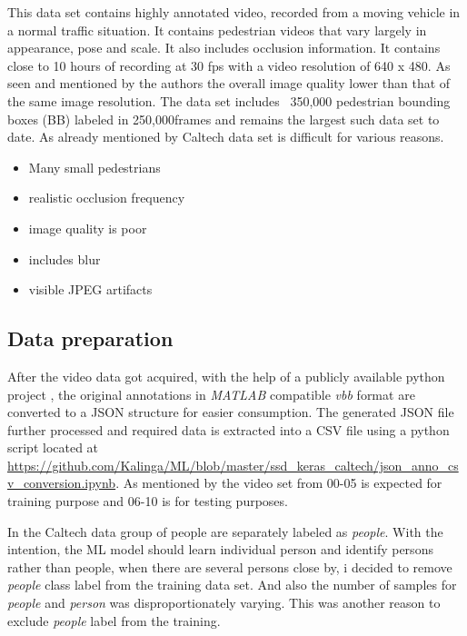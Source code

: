 \newpara
This data set contains highly annotated video, recorded from a moving vehicle in a normal traffic situation. It contains pedestrian videos that vary largely in appearance, pose and scale. It also includes occlusion information. It contains close to 10 hours of recording at 30 fps with a video resolution of 640 x 480. As seen and mentioned by the authors the overall image quality lower than that of the same image resolution. The data set includes ~350,000  pedestrian bounding boxes (BB) labeled in 250,000frames and remains the largest such data set to  date. As already mentioned by \cite{walk2010new} Caltech data set is difficult for various reasons.

\begin{itemize}
	\setlength\itemsep{-1em}
	\item Many small pedestrians
	\item realistic occlusion frequency
	\item image quality is poor
	\item includes blur
	\item visible JPEG artifacts
\end{itemize}

\subsection{Data preparation}
After the video data got acquired, with the help of a publicly available python project \cite{shuntasaito2015}, the original annotations in \textit{MATLAB} compatible \textit{vbb} format are converted to a JSON structure for easier consumption. The generated JSON file further processed and required data is extracted into a CSV file using a python script located at \url{ https://github.com/Kalinga/ML/blob/master/ssd_keras_caltech/json_anno_csv_conversion.ipynb}. As mentioned by \cite{dollar2009pedestrian} the video set from 00-05 is expected for training purpose and 06-10 is for testing purposes.

In the Caltech data group of people are separately labeled as \textit{people}. With the intention, the ML model should learn individual person and identify persons rather than people, when there are several persons close by, i decided to remove \textit{people} class label from the training data set. And also the number of samples for \textit{people} and \textit{person} was disproportionately varying. This was another reason to exclude \textit{people }label from  the training. 

